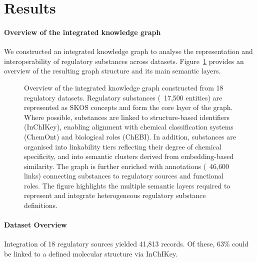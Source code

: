 \section{Results}
\label{sec:results}


\paragraph{Overview of the integrated knowledge graph}
\label{sec:knowledge_graph}

We constructed an integrated knowledge graph to analyse the representation 
and interoperability of regulatory substances across datasets. 
Figure~\ref{fig:knowledge_graph} provides an overview of the resulting 
graph structure and its main semantic layers.

\begin{figure}[!ht]
	\centering                                                             
	\caption{
		Overview of the integrated knowledge graph constructed from 18 regulatory datasets. 
		Regulatory substances (~17,500 entities) are represented as SKOS concepts 
		and form the core layer of the graph. 
		Where possible, substances are linked to structure-based identifiers (InChIKey), 
		enabling alignment with chemical classification systems (ChemOnt) 
		and biological roles (ChEBI). 
		In addition, substances are organised into linkability tiers 
		reflecting their degree of chemical specificity, and into 
		semantic clusters derived from embedding-based similarity. 
		The graph is further enriched with annotations (~46,600 links) 
		connecting substances to regulatory sources and functional roles. 
		The figure highlights the multiple semantic layers 
		required to represent and integrate heterogeneous regulatory substance definitions.
	}\label{fig:knowledge_graph}
\end{figure} 

\paragraph{Dataset Overview}

Integration of 18 regulatory sources yielded 41,813 records. Of these,
63\% could be linked to a defined molecular structure via InChIKey.


